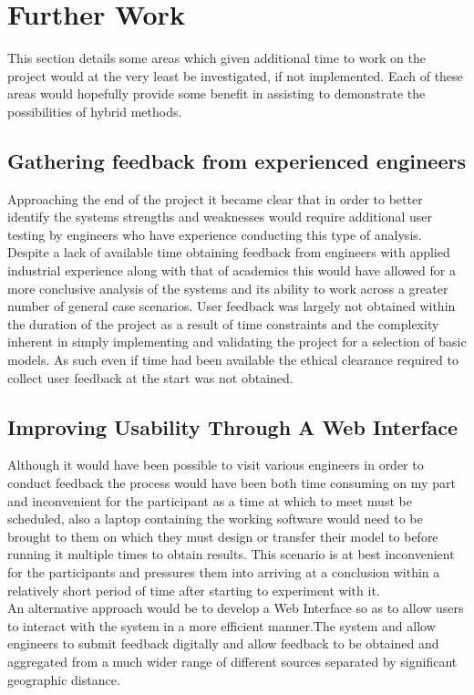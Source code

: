 
\section{Further Work}
This section details some areas which given additional time to work on the project would at the very least be investigated, if not implemented. Each of these areas would hopefully provide some benefit in assisting to demonstrate the possibilities of hybrid methods.

\subsection{Gathering feedback from experienced engineers}
Approaching the end of the project it became clear that in order to better identify the systems strengths and weaknesses would require additional user testing by engineers who have experience conducting this type of analysis. Despite a lack of available time obtaining feedback from engineers with applied industrial experience along with that of academics this would have allowed for a more conclusive analysis of the systems and its ability to work across a greater number of general case scenarios. 
User feedback was largely not obtained within the duration of the project as a result of time constraints and the complexity inherent in simply implementing and validating the project for a selection of basic models. As such even if time had been available the ethical clearance required to collect user feedback at the start was not obtained.


\subsection{Improving Usability Through A Web Interface}
Although it would have been possible to visit various engineers in order to conduct feedback the process would have been both time consuming on my part and inconvenient for the participant as a time at which to meet must be scheduled, also a laptop containing the working software would need to be brought to them on which they must design or transfer their model to before running it multiple times to obtain results. This scenario is at best inconvenient for the participants and pressures them into arriving at a conclusion within a relatively short period of time after starting to experiment with it. \\ 

\noindent
An alternative approach would be to develop a Web Interface so as to allow users to interact with the system in a more efficient manner.The system and allow engineers to submit feedback digitally and allow feedback to be obtained and aggregated from a much wider range of different sources separated by significant geographic distance. \\\ 

